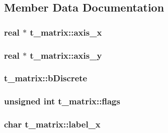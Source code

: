 \subsection{\-Member \-Data \-Documentation}
\hypertarget{structt__matrix_ad3a481279aeda7b10de72bedd35a6ef6}{
\subsubsection[{axis\-\_\-x}]{\setlength{\rightskip}{0pt plus 5cm}real $\ast$ {\bf t\-\_\-matrix\-::axis\-\_\-x}}}\label{structt__matrix_ad3a481279aeda7b10de72bedd35a6ef6}
\hypertarget{structt__matrix_ad30bb2cd7913d8fcc8dda043d6be8edb}{
\subsubsection[{axis\-\_\-y}]{\setlength{\rightskip}{0pt plus 5cm}real $\ast$ {\bf t\-\_\-matrix\-::axis\-\_\-y}}}\label{structt__matrix_ad30bb2cd7913d8fcc8dda043d6be8edb}
\hypertarget{structt__matrix_ac0c2d5aadb4d33433e611deaddc2fd6b}{
\subsubsection[{b\-Discrete}]{ {\bf t\-\_\-matrix\-::b\-Discrete}}}\label{structt__matrix_ac0c2d5aadb4d33433e611deaddc2fd6b}
\hypertarget{structt__matrix_abcfcc4494b84c1a4675f173fce6c02b0}{
\subsubsection[{flags}]{\setlength{\rightskip}{0pt plus 5cm}unsigned int {\bf t\-\_\-matrix\-::flags}}}\label{structt__matrix_abcfcc4494b84c1a4675f173fce6c02b0}
\hypertarget{structt__matrix_abcc1df7c7cf4b14b72cd9fe0092c5889}{
\subsubsection[{label\-\_\-x}]{\setlength{\rightskip}{0pt plus 5cm}char {\bf t\-\_\-matrix\-::label\-\_\-x}}}\label{structt__matrix_abcc1df7c7cf4b14b72cd9fe0092c5889}
